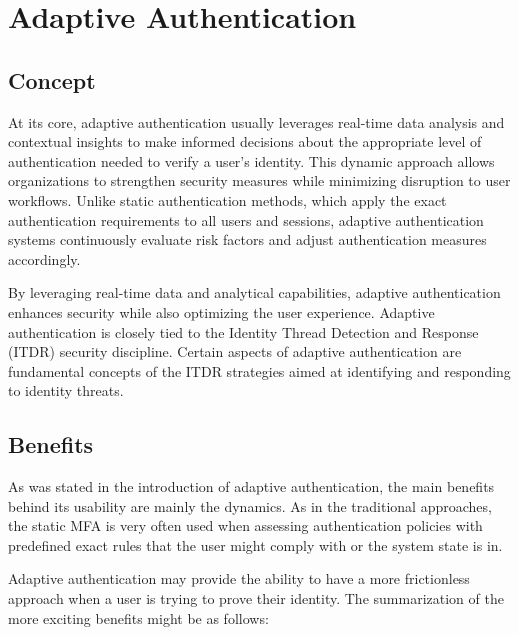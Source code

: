 \chapter{Adaptive Authentication} \label{adaptive-authentication}
\section{Concept}

At its core, adaptive authentication usually leverages real-time data analysis and contextual insights to make informed decisions about the appropriate level of authentication needed to verify a user's identity.
This dynamic approach allows organizations to strengthen security measures while minimizing disruption to user workflows.
Unlike static authentication methods, which apply the exact authentication requirements to all users and sessions, adaptive authentication systems continuously evaluate risk factors and adjust authentication measures accordingly.

By leveraging real-time data and analytical capabilities, adaptive authentication enhances security while also optimizing the user experience.\cite{intro-logintc}
Adaptive authentication is closely tied to the Identity Thread Detection and Response (ITDR) security discipline.
Certain aspects of adaptive authentication are fundamental concepts of the ITDR strategies aimed at identifying and responding to identity threats.

\section{Benefits}
As was stated in the introduction of adaptive authentication, the main benefits behind its usability are mainly the dynamics.
As in the traditional approaches, the static MFA is very often used when assessing authentication policies with predefined exact rules that the user might comply with or the system state is in. 

Adaptive authentication may provide the ability to have a more frictionless approach when a user is trying to prove their identity.
\cite{intro-silverfort,intro-descope}
The summarization of the more exciting benefits might be as follows:

